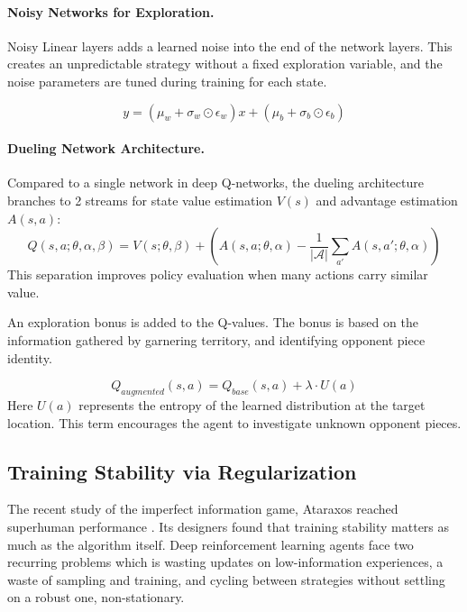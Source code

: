 \paragraph{Noisy Networks for Exploration.}
Noisy Linear layers \cite{Yang2023Exploration} adds a learned noise into the end of the network layers. This creates an unpredictable strategy without a fixed exploration variable, and the noise parameters are tuned during training for each state.

\begin{equation}
y = (\mu_w + \sigma_w \odot \epsilon_w)x + (\mu_b + \sigma_b \odot \epsilon_b)
\end{equation}

\paragraph{Dueling Network Architecture.}
Compared to a single network in deep Q-networks, the dueling architecture \cite{Dueling2022} branches to 2 streams for state value estimation $V(s)$ and advantage estimation $A(s, a)$:
\begin{equation}
Q(s, a; \theta, \alpha, \beta) = V(s; \theta, \beta) + \left( A(s, a; \theta, \alpha) - \frac{1}{|\mathcal{A}|} \sum_{a'} A(s, a'; \theta, \alpha) \right)
\end{equation}
This separation improves policy evaluation when many actions carry similar value.

An exploration bonus is added to the Q-values. The bonus is based on the information gathered by garnering territory, and identifying opponent piece identity.

\begin{equation}
Q_{augmented}(s, a) = Q_{base}(s, a) + \lambda \cdot U(a)
\end{equation}
Here $U(a)$ represents the entropy of the learned distribution at the target location. This term encourages the agent to investigate unknown opponent pieces.

\subsection{Training Stability via Regularization}

The recent study of the imperfect information game, Ataraxos reached superhuman performance \cite{Ataraxos2025}. Its designers found that training stability matters as much as the algorithm itself. Deep reinforcement learning agents face two recurring problems which is wasting updates on low-information experiences, a waste of sampling and training, and cycling between strategies without settling on a robust one, non-stationary.

